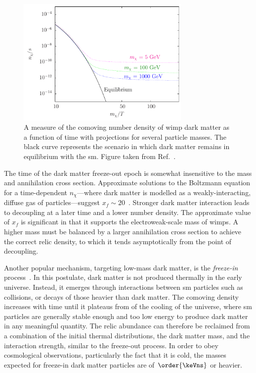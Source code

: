 \begin{figure}[htbp]
    \centering
    \includegraphics[width=0.75\textwidth]{figures/dm_abundance.pdf}
    \caption[A measure of the comoving number density of WIMP dark matter as a function of time with projections for several particle masses]{A measure of the comoving number density of \acrshort{wimp} dark matter as a function of time with projections for several particle masses. The black curve represents the scenario in which dark matter remains in equilibrium with the \acrlong{sm}. Figure taken from Ref.~.}
    \label{fig:theory_dm_abundance}
\end{figure}

The time of the dark matter freeze-out epoch is somewhat insensitive to the mass and annihilation cross section. Approximate solutions to the Boltzmann equation for a time-dependent $n_{\chi}$---where dark matter is modelled as a weakly-interacting, diffuse gas of particles---suggest $x_f \sim \text{20}$~\cite{Lisanti:2016jxe,Bender:2012gc}. Stronger dark matter interaction leads to decoupling at a later time and a lower number density. The approximate value of $x_f$ is significant in that it supports the electroweak-scale mass of \acrshort{wimp}s. A higher mass must be balanced by a larger annihilation cross section to achieve the correct relic density, to which it tends asymptotically from the point of decoupling.

Another popular mechanism, targeting low-mass dark matter, is the \emph{freeze-in} process~\cite{Hall:2009bx,Krnjaic:2017tio}. In this postulate, dark matter is not produced thermally in the early universe. Instead, it emerges through interactions between \acrshort{sm} particles such as collisions, or decays of those heavier than dark matter. The comoving density increases with time until it plateaus from of the cooling of the universe, where \acrshort{sm} particles are generally stable enough and too low energy to produce dark matter in any meaningful quantity. The relic abundance can therefore be reclaimed from a combination of the initial thermal distributions, the dark matter mass, and the interaction strength, similar to the freeze-out process. In order to obey cosmological observations, particularly the fact that it is cold, the masses expected for freeze-in dark matter particles are of $\order{\keVns}$ or heavier.


